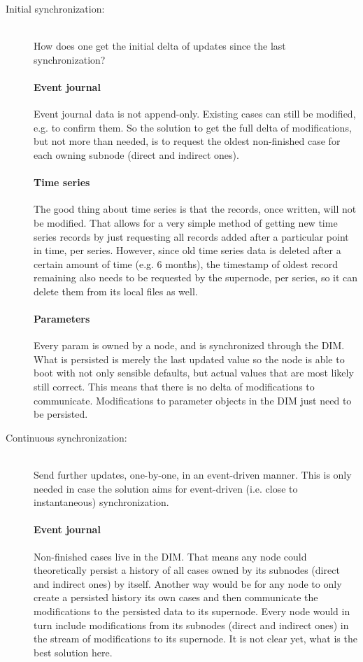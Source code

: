 \begin{description}
	\item [Initial synchronization:]\hfill\\
		How does one get the initial delta of updates since the last
		synchronization?


		\paragraph{Event journal} Event journal data is not
		append-only. Existing cases can still be modified, e.g. to
		confirm them. So the solution to get the full delta of
		modifications, but not more than needed, is to request the
		oldest non-finished case for each owning subnode (direct and
		indirect ones).

		\paragraph{Time series} The good thing about time series is
		that the records, once written, will not be modified. That allows
		for a very simple method of getting new time series records by
		just requesting all records added after a particular point in
		time, per series. However, since old time series data is
		deleted after a certain amount of time (e.g. 6 months), the
		timestamp of oldest record remaining also needs to be requested
		by the supernode, per series, so it can delete them from its
		local files as well.

		\paragraph{Parameters} Every param is owned by a node, and is
		synchronized through the DIM.  What is persisted is merely the
		last updated value so the node is able to boot with not only
		sensible defaults, but actual values that are most likely still
		correct. This means that there is no delta of modifications to
		communicate. Modifications to parameter objects in the DIM just
		need to be persisted.

	\item [Continuous synchronization:]\hfill\\
		Send further updates, one-by-one, in an event-driven manner.
		This is only needed in case the solution aims for event-driven
		(i.e. close to instantaneous) synchronization.

		\paragraph{Event journal} Non-finished cases live in the DIM.
		That means any node could theoretically persist a history of
		all cases owned by its subnodes (direct and indirect ones) by
		itself. Another way would be for any node to only create a
		persisted history its own cases and then communicate the
		modifications to the persisted data to its supernode. Every
		node would in turn include modifications from its subnodes
		(direct and indirect ones) in the stream of modifications to
		its supernode. {\color{red}It is not clear yet, what is the best
		solution here.}\\


\end{description}
